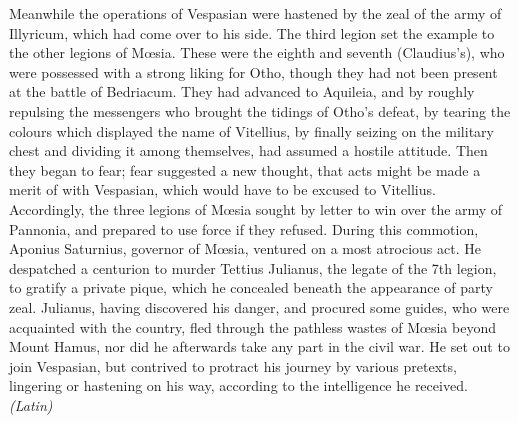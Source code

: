 Meanwhile the operations of Vespasian were hastened by the zeal of the army of Illyricum, which had come over to his side. The third legion set the example to the other legions of Mœsia. These were the eighth and seventh (Claudius's), who were possessed with a strong liking for Otho, though they had not been present at the battle of Bedriacum. They had advanced to Aquileia, and by roughly repulsing the messengers who brought the tidings of Otho's defeat, by tearing the colours which displayed the name of Vitellius, by finally seizing on the military chest and dividing it among themselves, had assumed a hostile attitude. Then they began to fear; fear suggested a new thought, that acts might be made a merit of with Vespasian, which would have to be excused to Vitellius. Accordingly, the three legions of Mœsia sought by letter to win over the army of Pannonia, and prepared to use force if they refused. During this commotion, Aponius Saturnius, governor of Mœsia, ventured on a most atrocious act. He despatched a centurion to murder Tettius Julianus, the legate of the 7th legion, to gratify a private pique, which he concealed beneath the appearance of party zeal. Julianus, having discovered his danger, and procured some guides, who were acquainted with the country, fled through the pathless wastes of Mœsia beyond Mount Hamus, nor did he afterwards take any part in the civil war. He set out to join Vespasian, but contrived to protract his journey by various pretexts, lingering or hastening on his way, according to the intelligence he received. \emph{(Latin)}


